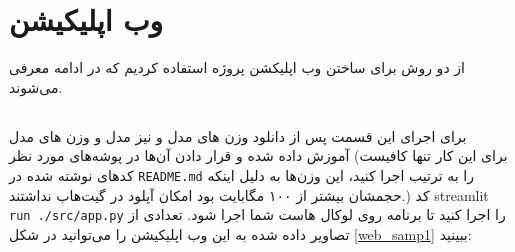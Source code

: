 \documentclass[12pt,a4paper]{report}
\begin{document}
\chapter{وب اپلیکیشن}
از دو روش برای ساختن وب اپلیکشن پروژه استفاده کردیم که در ادامه معرفی می‌شوند.
\section{}
برای اجرای این قسمت پس از دانلود وزن های مدل  و نیز مدل و  وزن های  مدل آموزش داده شده  و قرار دادن آن‌ها در پوشه‌های مورد نظر
(برای این کار تنها کافیست کدهای نوشته شده در \verb"README.md" را  به ترتیب اجرا کنید، این وزن‌ها به دلیل اینکه حجمشان بیشتر از ۱۰۰ مگابایت بود امکان آپلود در گیت‌هاب نداشتند.)
کد streamlit \verb"run ./src/app.py" را اجرا کنید تا برنامه روی لوکال هاست شما اجرا شود.
تعدادی از تصاویر داده شده به این وب اپلیکیشن را می‌توانید در شکل \ref{web_samp1} ببینید:
\end{document}
